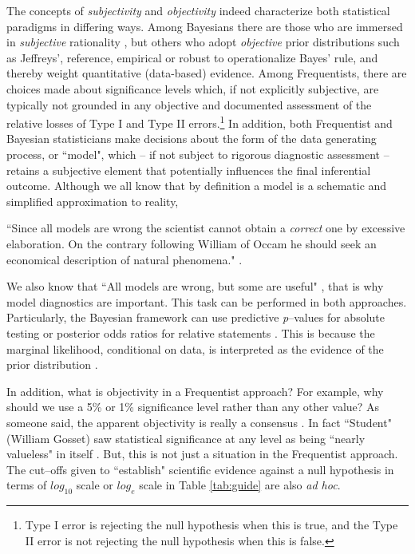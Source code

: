 The concepts of \textit{subjectivity} and \textit{objectivity} indeed characterize both statistical paradigms in differing ways. Among Bayesians there are those who are immersed in \textit{subjective} rationality \cite{Ramsey1926, deFinetti1937, savage1954, Lindley2000}, but others who adopt \textit{objective} prior distributions such as Jeffreys', reference, empirical or robust \cite{Bayes1763, Laplace1812, Jeffreys1961, Berger2006} to operationalize Bayes' rule, and thereby weight quantitative (data-based) evidence. Among Frequentists, there are choices made about significance levels which, if not explicitly subjective, are typically not grounded in any objective and documented assessment of the relative losses of Type I and Type II errors.\footnote{Type I error is rejecting the null hypothesis when this is true, and the Type II error is not rejecting the null hypothesis when this is false.} In addition, both Frequentist and Bayesian statisticians make decisions about the form of the data generating process, or ``model", which -- if not subject to rigorous diagnostic assessment -- retains a subjective element that potentially influences the final inferential outcome. Although we all know that by definition a model is a schematic and simplified approximation to reality, 

``Since all models are wrong the scientist cannot obtain a \textit{correct} one by excessive elaboration. On the contrary following William of Occam he should seek an economical description of natural phenomena." \cite{Box1976}.


We also know that ``All models are wrong, but some are useful" \cite{box1979robustness}, that is why model diagnostics are important. This task can be performed in both approaches. Particularly, the Bayesian framework can use predictive \textit{p}--values for absolute testing \cite{Gelman1996,Bayarri2000} or posterior odds ratios for relative statements \cite{Jeffreys1935, Kass1995}. This is because the marginal likelihood, conditional on data, is interpreted as the evidence of the prior distribution \cite{berger93}.

In addition, what is objectivity in a Frequentist approach? For example, why should we use a 5\% or 1\% significance level rather than any other value? As someone said, the apparent objectivity is really a consensus \cite{Lindley2000}. In fact ``Student" (William Gosset) saw statistical significance at any level as being ``nearly valueless" in itself \cite{Ziliak2008}. But, this is not just a situation in the Frequentist approach. The cut--offs given to ``establish" scientific evidence against a null hypothesis in terms of $log_{10}$ scale \cite{Jeffreys1961} or $log_{e}$ scale \cite{Kass1995} in Table \ref{tab:guide} are also \textit{ad hoc}.

